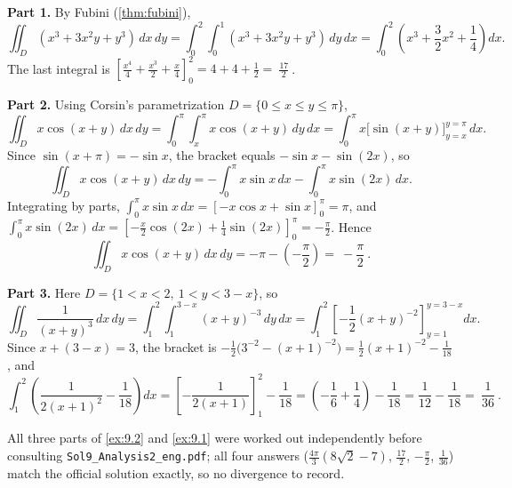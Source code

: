 \begin{exercisesolution}
\textbf{Part 1.} By Fubini (\cref{thm:fubini}),
\[\iint_D (x^3+3x^2y+y^3)\,dx\,dy = \int_0^2\int_0^1 (x^3+3x^2y+y^3)\,dy\,dx
  = \int_0^2\left(x^3+\frac32x^2+\frac14\right)dx.\]
The last integral is $\left[\tfrac{x^4}{4}+\tfrac{x^3}{2}+\tfrac{x}{4}\right]_0^2 = 4+4+\tfrac12
= \boxed{\ \tfrac{17}{2}\ }$.

\textbf{Part 2.} Using Corsin's parametrization $D=\{0\leq x\leq y\leq\pi\}$,
\[\iint_D x\cos(x+y)\,dx\,dy = \int_0^\pi\int_x^\pi x\cos(x+y)\,dy\,dx
  = \int_0^\pi x\big[\sin(x+y)\big]_{y=x}^{y=\pi}\,dx.\]
Since $\sin(x+\pi) = -\sin x$, the bracket equals $-\sin x - \sin(2x)$, so
\[\iint_D x\cos(x+y)\,dx\,dy = -\int_0^\pi x\sin x\,dx - \int_0^\pi x\sin(2x)\,dx.\]
Integrating by parts, $\int_0^\pi x\sin x\,dx = [-x\cos x+\sin x]_0^\pi = \pi$, and
$\int_0^\pi x\sin(2x)\,dx = \left[-\tfrac{x}{2}\cos(2x)+\tfrac14\sin(2x)\right]_0^\pi
= -\tfrac\pi2$. Hence
\[\iint_D x\cos(x+y)\,dx\,dy = -\pi - \left(-\frac\pi2\right) = \boxed{\ -\frac\pi2\ }.\]

\textbf{Part 3.} Here $D = \{1<x<2,\ 1<y<3-x\}$, so
\[\iint_D \frac{1}{(x+y)^3}\,dx\,dy = \int_1^2\int_1^{3-x} (x+y)^{-3}\,dy\,dx
  = \int_1^2 \left[-\frac12(x+y)^{-2}\right]_{y=1}^{y=3-x}dx.\]
Since $x+(3-x)=3$, the bracket is $-\tfrac12\big(3^{-2}-(x+1)^{-2}\big)
= \tfrac12(x+1)^{-2} - \tfrac1{18}$, and
\[\int_1^2\left(\frac{1}{2(x+1)^2}-\frac1{18}\right)dx
  = \left[-\frac{1}{2(x+1)}\right]_1^2 - \frac1{18}
  = \left(-\frac16+\frac14\right) - \frac1{18} = \frac1{12}-\frac1{18}
  = \boxed{\ \frac1{36}\ }.\]
\end{exercisesolution}

\begin{ainote}
All three parts of \cref{ex:9.2} and \cref{ex:9.1} were worked out independently before
consulting \texttt{Sol9\_Analysis2\_eng.pdf}; all four answers ($\tfrac{4\pi}{3}(8\sqrt2-7)$,
$\tfrac{17}{2}$, $-\tfrac\pi2$, $\tfrac1{36}$) match the official solution exactly, so no
divergence to record.
\end{ainote}
